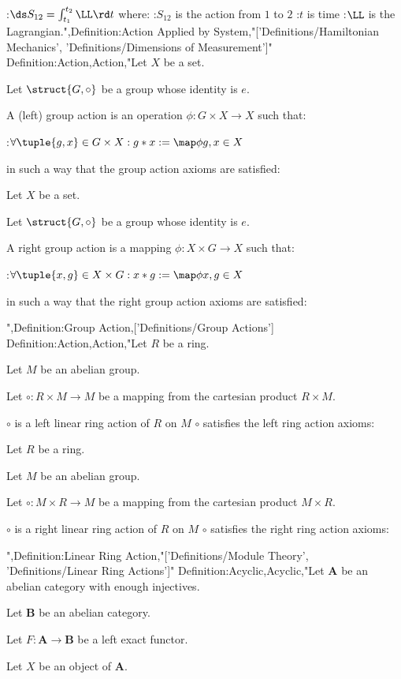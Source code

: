 :$\ds S_{12} = \int_{t_1}^{t_2} \LL \rd t$
where:
:$S_{12}$ is the action from $1$ to $2$
:$t$ is time
:$\LL$ is the Lagrangian.",Definition:Action Applied by System,"['Definitions/Hamiltonian Mechanics', 'Definitions/Dimensions of Measurement']"
Definition:Action,Action,"Let $X$ be a set.

Let $\struct {G, \circ}$ be a group whose identity is $e$.


A (left) group action is an operation $\phi: G \times X \to X$ such that:

:$\forall \tuple {g, x} \in G \times X: g * x := \map \phi {g, x} \in X$

in such a way that the group action axioms are satisfied:

Let $X$ be a set.

Let $\struct {G, \circ}$ be a group whose identity is $e$.


A right group action is a mapping $\phi: X \times G \to X$ such that:

:$\forall \tuple {x, g} \in X \times G : x * g := \map \phi {x, g} \in X$

in such a way that the right group action axioms are satisfied:

",Definition:Group Action,['Definitions/Group Actions']
Definition:Action,Action,"Let $R$ be a ring.

Let $M$ be an abelian group.

Let $\circ : R \times M \to M$ be a mapping from the cartesian product $R \times M$.


$\circ$ is a left linear ring action of $R$ on $M$  $\circ$ satisfies the left ring action axioms:

Let $R$ be a ring.

Let $M$ be an abelian group.

Let $\circ : M \times R \to M$ be a mapping from the cartesian product $M \times R$.


$\circ$ is a right linear ring action of $R$ on $M$  $\circ$ satisfies the right ring action axioms:

",Definition:Linear Ring Action,"['Definitions/Module Theory', 'Definitions/Linear Ring Actions']"
Definition:Acyclic,Acyclic,"Let $\mathbf A$ be an abelian category with enough injectives.

Let $\mathbf B$ be an abelian category.

Let $F : \mathbf A \to \mathbf B$ be a left exact functor.

Let $X$ be an object of $\mathbf A$.


